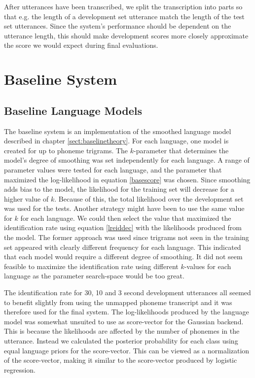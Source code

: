 After utterances have been transcribed, we split the transcription into parts so that e.g. the length of a development set utterance match the length of the test set utterances. Since the system's performance should be dependent on the utterance length, this should make development scores more closely approximate the score we would expect during final evaluations. 

\chapter{Baseline System}

\section{Baseline Language Models}

The baseline system is an implementation of the smoothed language model described in chapter \ref{sect:baselinetheory}. For each language, one model is created for up to phoneme trigrams. The $k$-parameter that determines the model's degree of smoothing was set independently for each language. A range of parameter values were tested for each language, and the parameter that maximized the log-likelihood in equation \ref{basescore} was chosen. Since smoothing adds bias to the model, the likelihood for the training set will decrease for a higher value of $k$. Because of this, the total likelihood over the development set was used for the tests. Another strategy might have been to use the same value for $k$ for each language. We could then select the value that maximized the identification rate using equation \ref{lreiddec} with the likelihoods produced from the model. The former approach was used since trigrams not seen in the training set appeared with clearly different frequency for each language. This indicated that each model would require a different degree of smoothing. It did not seem feasible to maximize the identification rate using different $k$-values for each language as the parameter search-space would be too great. 

The identification rate for 30, 10 and 3 second development utterances all seemed to benefit slightly from using the unmapped phoneme transcript and it was therefore used for the final system. The log-likelihoods produced by the language model was somewhat unsuited to use as score-vector for the Gaussian backend. This is because the likelihoods are affected by the number of  phonemes in the utterance. Instead we calculated the posterior probability for each class using equal language priors for the score-vector. This can be viewed as a normalization of the score-vector, making it similar to the score-vector produced by logistic regression.

